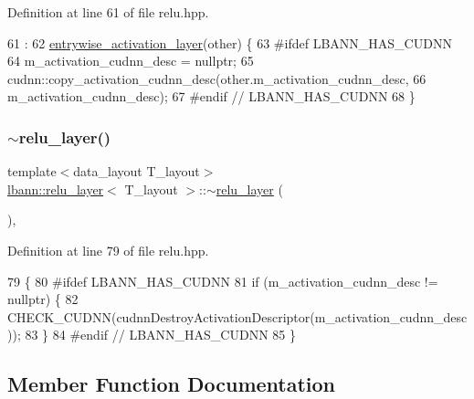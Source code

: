 Definition at line 61 of file relu.\+hpp.


\begin{DoxyCode}
61                                       :
62     \hyperlink{classlbann_1_1entrywise__activation__layer_aada1d9200612dcd13259799ef327c557}{entrywise\_activation\_layer}(other) \{
63 \textcolor{preprocessor}{  #ifdef LBANN\_HAS\_CUDNN}
64     m\_activation\_cudnn\_desc = \textcolor{keyword}{nullptr};
65     cudnn::copy\_activation\_cudnn\_desc(other.m\_activation\_cudnn\_desc,
66                                       m\_activation\_cudnn\_desc);
67 \textcolor{preprocessor}{  #endif // LBANN\_HAS\_CUDNN}
68   \}
\end{DoxyCode}
\mbox{\label{classlbann_1_1relu__layer_a86024c01b02a5ddbe8de3c4c264d45fa}} 
\subsubsection{\texorpdfstring{$\sim$relu\+\_\+layer()}{~relu\_layer()}}
{\footnotesize\ttfamily template$<$data\+\_\+layout T\+\_\+layout$>$ \\
\hyperlink{classlbann_1_1relu__layer}{lbann\+::relu\+\_\+layer}$<$ T\+\_\+layout $>$\+::$\sim$\hyperlink{classlbann_1_1relu__layer}{relu\+\_\+layer} (\begin{DoxyParamCaption}{ }\end{DoxyParamCaption})\hspace{0.3cm}{\ttfamily [inline]}, {\ttfamily [override]}}



Definition at line 79 of file relu.\+hpp.


\begin{DoxyCode}
79                          \{
80 \textcolor{preprocessor}{  #ifdef LBANN\_HAS\_CUDNN}
81     \textcolor{keywordflow}{if} (m\_activation\_cudnn\_desc != \textcolor{keyword}{nullptr}) \{
82       CHECK\_CUDNN(cudnnDestroyActivationDescriptor(m\_activation\_cudnn\_desc));
83     \}
84 \textcolor{preprocessor}{  #endif // LBANN\_HAS\_CUDNN}
85   \}
\end{DoxyCode}


\subsection{Member Function Documentation}
\mbox{\label{classlbann_1_1relu__layer_a24c9b5e006e4a0b3f8992c1c44ce9ba5}} 
